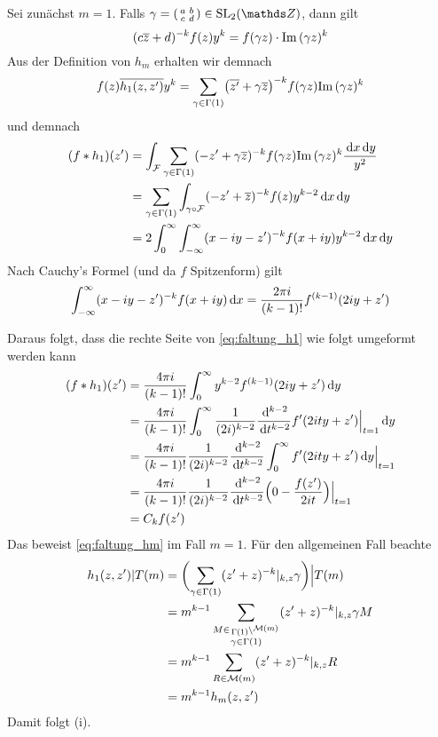\begin{bewe}
	Sei zunächst $m=1$.
	Falls $\gamma = \abcd \in \SL_2(\ZZ)$, dann gilt
	\[
	(c\overline{z} + d)^{-k} f(z) y^k = f(\gamma z) \cdot \mathrm{Im}\, (\gamma z)^k
	\]
	Aus der Definition von $h_m$ erhalten wir demnach
	\[
	f(z)\overline{h_1(z, z')} y^k
	= \sum_{\gamma \in \Gamma(1)} \bigl(\overline{z'} + \gamma \overline{z}\bigr)^{-k} f(\gamma z) \mathrm{Im}\,(\gamma z)^k
	\]
	und demnach
	\begin{equation}\label{eq:faltung_h1}%
	\begin{split}
	(f * h_1)(z') &= \int_\F \sum_{\gamma \in \Gamma(1)} (-z' + \gamma \conj z)^{-k} f(\gamma z) \Im(\gamma z)^k \frac{\opd x \opd y}{y^2} \\
	&= \sum_{\gamma \in \Gamma(1)} \int_{\gamma \circ \F} (-z' + \conj z)^{-k} f(z) y^{k-2} \opd x \opd y \\
	&= 2 \int_0^\infty \int_{-\infty}^\infty (x-iy - z')^{-k} f(x+iy) y^{k-2} \opd x \opd y
	\end{split}
	\end{equation}
	Nach Cauchy's Formel (und da $f$ Spitzenform) gilt
	\[
	\int_{-\infty}^\infty (x-iy - z')^{-k} f(x+iy) \,\mathrm{d} x
	= \frac{2\pi i}{(k-1)!} f^{(k-1)} (2iy + z')
	\]
	
	Daraus folgt, dass die rechte Seite von \eqref{eq:faltung_h1} wie folgt umgeformt werden kann
	\begin{equation*}
	\begin{split}
	(f * h_1)(z') &= \frac{4\pi i}{(k-1)!} \int_0^\infty y^{k-2} f^{(k-1)} (2iy + z') \,\mathrm{d} y \\
	&= \frac{4\pi i}{(k-1)!} \int_0^\infty \frac{1}{(2i)^{k-2}} \frac{\,\mathrm{d}^{k-2}}{\,\mathrm{d} t^{k-2}} f'(2ity + z') \Big|_{t=1} \,\mathrm{d} y \\
	&= \frac{4\pi i}{(k-1)!} \frac{1}{(2i)^{k-2}} \frac{\,\mathrm{d}^{k-2}}{\,\mathrm{d} t^{k-2}} \int_0^\infty f'(2i ty + z') \,\mathrm{d} y \Big|_{t=1} \\
	&= \frac{4\pi i}{(k-1)!} \frac{1}{(2i)^{k-2}} \frac{\,\mathrm{d}^{k-2}}{\,\mathrm{d} t^{k-2}} \Bigl( 0 - \frac{f(z')}{2it}\Bigr) \Big|_{t=1} \\
	&= C_k f(z')
	\end{split}
	\end{equation*}
	Das beweist \eqref{eq:faltung_hm} im Fall $m=1$.
	Für den allgemeinen Fall beachte
	\[
	\begin{split}
	h_1(z,z')|T(m)
	&= \biggl(\sum_{\gamma\in\Gamma(1)} (z'+z)^{-k} |_{k,z} \gamma\biggr)\Big|T(m) \\
	&= m^{k-1} \sum_{\substack{M \in \linksmodulo{\Gamma(1)}{\M(m)}\\ \gamma \in \Gamma(1)}} (z'+z)^{-k} |_{k,z} \gamma M \\
	&= m^{k-1} \sum_{R \in \M(m)} (z'+z)^{-k}|_{k,z} R \\
	&= m^{k-1} h_m(z,z')
	\end{split}
	\]
	Damit folgt (i).
	

\end{bewe}

